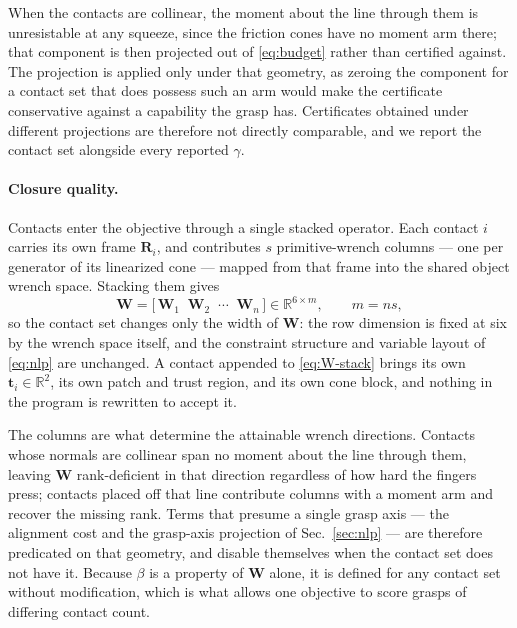 When the contacts are collinear, the moment about the line through them is
unresistable at any squeeze, since the friction cones have no moment arm there; that
component is then projected out of \eqref{eq:budget} rather than certified against.
The projection is applied only under that geometry, as zeroing the component for a
contact set that does possess such an arm would make the certificate conservative
against a capability the grasp has. Certificates obtained under different projections
are therefore not directly comparable, and we report the contact set alongside every
reported $\gamma$.

\paragraph{Closure quality.}
\label{sec:closure}
Contacts enter the objective through a single stacked operator. Each contact $i$
carries its own frame $\bm{R}_i$, and contributes $s$ primitive-wrench columns --- one
per generator of its linearized cone --- mapped from that frame into the shared object
wrench space. Stacking them gives
%
\begin{equation}
  \bm{W} = \bigl[\, \bm{W}_1 \;\; \bm{W}_2 \;\; \cdots \;\; \bm{W}_n \,\bigr]
  \in \mathbb{R}^{6 \times m}, \qquad m = n s ,
  \label{eq:W-stack}
\end{equation}
%
so the contact set changes only the width of $\bm{W}$: the row dimension is fixed at
six by the wrench space itself, and the constraint structure and variable layout of
\eqref{eq:nlp} are unchanged. A contact appended to \eqref{eq:W-stack} brings its own
$\bm{t}_i \in \mathbb{R}^2$, its own patch and trust region, and its own cone block,
and nothing in the program is rewritten to accept it.

The columns are what determine the attainable wrench directions. Contacts whose
normals are collinear span no moment about the line through them, leaving $\bm{W}$
rank-deficient in that direction regardless of how hard the fingers press; contacts
placed off that line contribute columns with a moment arm and recover the missing
rank. Terms that presume a single grasp axis --- the alignment cost and the grasp-axis
projection of Sec.~\ref{sec:nlp} --- are therefore predicated on that geometry, and
disable themselves when the contact set does not have it. Because $\beta$ is a
property of $\bm{W}$ alone, it is defined for any contact set without modification,
which is what allows one objective to score grasps of differing contact count.

